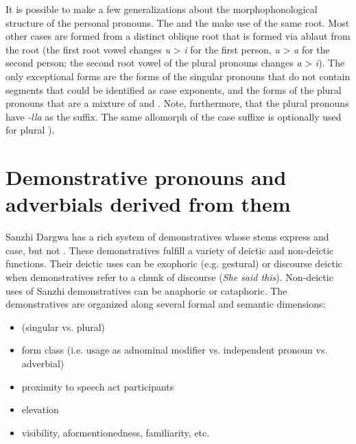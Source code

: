 It is possible to make a few generalizations about the morphophonological structure of the personal pronouns. The  and the  make use of the same root. Most other cases are formed from a distinct oblique root that is formed via ablaut from the  root (the first root vowel changes \textit{u} > \textit{i} for the first person, \textit{u} > \textit{a} for the second person; the second root vowel of the plural pronouns changes \textit{a} > \textit{i}). The only exceptional forms are the  forms of the singular pronouns that do not contain segments that could be identified as  case exponents, and the  forms of the plural pronouns that are a mixture of  and . Note, furthermore, that the plural pronouns have \textit{-lla} as the  suffix. The same allomorph of the  case suffixe is optionally used for plural  ).



\section{Demonstrative pronouns and adverbials derived from them}
\label{sec:Demonstrative pronouns}

Sanzhi Dargwa has a rich system of demonstratives whose stems express  and case, but not . These demonstratives fulfill a variety of deictic and non-deictic functions. Their deictic uses can be exophoric (e.g. gestural) or discourse deictic when demonstratives refer to a chunk of discourse (\textit{She said this}). Non-deictic uses of Sanzhi demonstratives can be anaphoric or cataphoric. The demonstratives are organized along several formal and semantic dimensions:
%

\begin{itemize}
	\item	{} (singular vs. plural)
	\item	form class (i.e. usage as adnominal modifier vs. independent pronoun vs. adverbial) 
	\item	proximity to speech act participants
	\item	elevation
	\item	visibility, aformentionedness, familiarity, etc.
\end{itemize}
%

